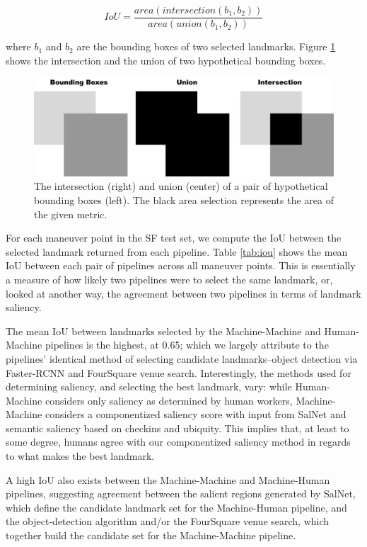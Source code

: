 \begin{equation}
    IoU = \frac{area(intersection(b_1,b_2))}{area(union(b_1,b_2))}
\end{equation}

where $b_1$ and $b_2$ are the bounding boxes of two selected landmarks. Figure \ref{fig:iou} shows the intersection and the union of two hypothetical bounding boxes.

\begin{figure}[htbp]
  \centering
  \includegraphics[width=\textwidth]{images/iou.pdf}
  \caption{The intersection (right) and union (center) of a pair of hypothetical bounding boxes (left). The black area selection represents the area of the given metric.}
  \label{fig:iou}
\end{figure}

For each maneuver point in the SF test set, we compute the IoU between the selected landmark returned from each pipeline. Table \ref{tab:iou} shows the mean IoU between each pair of pipelines across all maneuver points. This is essentially a measure of how likely two pipelines were to select the same landmark, or, looked at another way, the agreement between two pipelines in terms of landmark saliency.

The mean IoU between landmarks selected by the Machine-Machine and Human-Machine pipelines is the highest, at 0.65; which we largely attribute to the pipelines' identical method of selecting candidate landmarks--object detection via Faster-RCNN and FourSquare venue search. Interestingly, the methods used for determining saliency, and selecting the best landmark, vary: while Human-Machine considers only saliency as determined by human workers, Machine-Machine considers a componentized saliency score with input from SalNet and semantic saliency based on checkins and ubiquity. This implies that, at least to some degree, humans agree with our componentized saliency method in regards to what makes the best landmark.

A high IoU also exists between the Machine-Machine and Machine-Human pipelines, suggesting agreement between the salient regions generated by SalNet, which define the candidate landmark set for the Machine-Human pipeline, and the object-detection algorithm and/or the FourSquare venue search, which together build the candidate set for the Machine-Machine pipeline.


